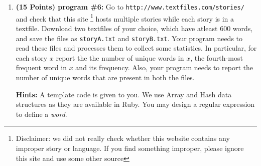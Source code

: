\documentclass[paper=letter, fontsize=11pt]{scrartcl} %
\begin{document}
\begin{enumerate}[noitemsep]
        \item \textbf{(15 Points) program \#6:} Go to \texttt{http://www.textfiles.com/stories/} and check that this site 
\footnote {Disclaimer: we did not really check whether this website contains any improper story or language. 
If you find something improper, please ignore this site and use some other source} hosts multiple stories 
while each story is in a textfile. Download two textfiles of your choice, which have atleast 600 words, 
and save the files as \texttt{storyA.txt} and \texttt{storyB.txt}. Your program needs to read these files and processes 
them to collect some statistics. In particular, for each story $x$ report the the number of unique words in $x$, 
the fourth-most frequent word in $x$ and its frequency. Also, your program needs to report the number of unique words that are present in both the files.

\textbf {Hints:} A template code is given to you. We use Array and Hash data structures as they are available in Ruby. You may design a regular expression to define a \emph{word}.  
    
\end{enumerate}
 
\end{document}
